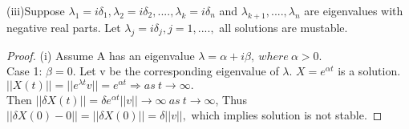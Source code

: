 (iii)Suppose $\lambda_1=i\delta_1, \lambda_2=i\delta_2, .... , \lambda_k=i\delta_n$ and $\lambda_{k+1}, .... ,\lambda_n$ are eigenvalues with negative real parts. Let $\lambda_j=i\delta_j, j=1, .... ,$ all solutions are mustable. \\
\begin{proof}
 (i) Assume A has an eigenvalue $\lambda=\alpha+i\beta,\ where\ \alpha>0.$ \\
Case 1: $\beta=0.$ Let v be the corresponding eigenvalue of $\lambda$. $X=e^{\alpha{t}}$ is a solution. $||X(t)||=||e^{\lambda{t}}v||=e^{\alpha{t}} \Rightarrow as\ t \to \infty.$\\
Then $||\delta X(t)||=\delta e^{\alpha{t}}||v|| \to \infty\ as\ t \to \infty$, Thus $||\delta X(0)-0||=||\delta X(0)||=\delta||v||,$ which implies solution is not stable.
\end{proof}








